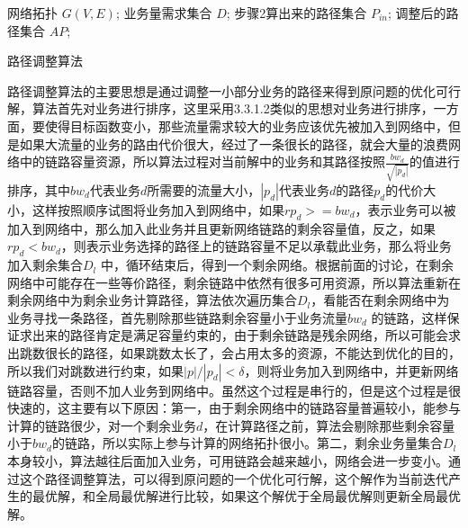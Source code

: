 \begin{algorithm}[t]
\begin{algorithmic}[1]
\Require
网络拓扑 $G(V, E)$;
业务量需求集合 $D$;
步骤2算出来的路径集合 $P_{in}$;
\Ensure
调整后的路径集合 $AP$;
\Else
{}
\EndIf
\EndFor
{}
\EndIf
\EndFor
{}
\EndIf
\EndFor
\end{algorithmic}
\caption{路径调整算法}
\label{PathAdj}
\end{algorithm}

路径调整算法的主要思想是通过调整一小部分业务的路径来得到原问题的优化可行解，算法首先对业务进行排序，这里采用3.3.1.2类似的思想对业务进行排序，一方面，要使得目标函数变小，那些流量需求较大的业务应该优先被加入到网络中，但是如果大流量的业务的路由代价很大，经过了一条很长的路径，就会大量的浪费网络中的链路容量资源，所以算法过程对当前解中的业务和其路径按照$\frac{bw_d}{\sqrt{|p_d|}}$的值进行排序，其中${bw_d}$代表业务$d$所需要的流量大小，$|p_d|$代表业务$d$的路径$p_d$的代价大小，这样按照顺序试图将业务加入到网络中，如果$rp_d>=bw_d$，表示业务可以被加入到网络中，那么加入此业务并且更新网络链路的剩余容量值，反之，如果$rp_d<bw_d$，则表示业务选择的路径上的链路容量不足以承载此业务，那么将业务加入剩余集合$D_l$ 中，循环结束后，得到一个剩余网络。根据前面的讨论，在剩余网络中可能存在一些等价路径，剩余链路中依然有很多可用资源，所以算法重新在剩余网络中为剩余业务计算路径，算法依次遍历集合$D_l$，看能否在剩余网络中为业务寻找一条路径，首先剔除那些链路剩余容量小于业务流量$bw_d$ 的链路，这样保证求出来的路径肯定是满足容量约束的，由于剩余链路是残余网络，所以可能会求出跳数很长的路径，如果跳数太长了，会占用太多的资源，不能达到优化的目的，所以我们对跳数进行约束，如果$|p|/|p_d|<\delta$，则将业务加入到网络中，并更新网络链路容量，否则不加人业务到网络中。虽然这个过程是串行的，但是这个过程是很快速的，这主要有以下原因：第一，由于剩余网络中的链路容量普遍较小，能参与计算的链路很少，对一个剩余业务$d$，在计算路径之前，算法会剔除那些剩余容量小于$bw_d$的链路，所以实际上参与计算的网络拓扑很小。第二，剩余业务量集合$D_l$本身较小，算法越往后面加入业务，可用链路会越来越小，网络会进一步变小。通过这个路径调整算法，可以得到原问题的一个优化可行解，这个解作为当前迭代产生的最优解，和全局最优解进行比较，如果这个解优于全局最优解则更新全局最优解。
